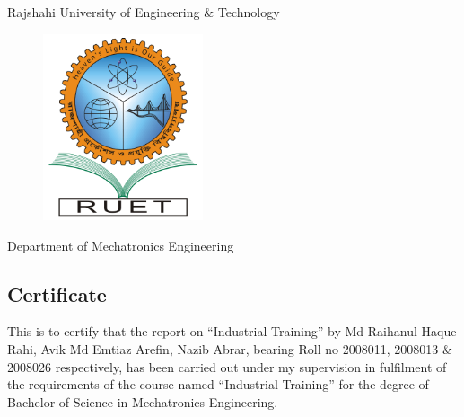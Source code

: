 \begin{center}
    Rajshahi University of Engineering \& Technology
\end{center}
\begin{figure}[h!]
    \centering
    \includegraphics[width=4.7cm]{figs/RUET.png}
    \label{fig:ruet2}
\end{figure}
\begin{center}
    Department of Mechatronics Engineering
    \subsection*{Certificate}
\end{center}
\noindent This is to certify that the report on “Industrial Training” by Md Raihanul Haque Rahi, Avik Md Emtiaz Arefin, Nazib Abrar, bearing Roll no 2008011, 2008013 \& 2008026 respectively, has been carried out under my supervision in fulfilment of the requirements of the course named “Industrial Training” for the degree of Bachelor of Science in Mechatronics Engineering.


